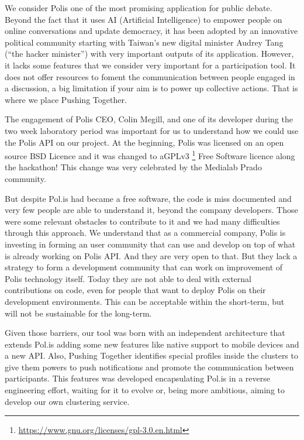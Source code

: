 \documentclass{llncs}
\begin{document}
  We consider Polis one of the most promising application for public debate.
Beyond the fact that it uses AI (Artificial Intelligence) to empower people
on online conversations and update democracy, it has been adopted by an
innovative political community starting with Taiwan's new digital minister
Audrey Tang (“the hacker minister”) with very important outputs of its
application. However, it lacks some features that we consider very important
for a participation tool. It does not offer resources to foment the
communication between people engaged in a discussion, a big limitation if your
aim is to power up collective actions. That is where we place Pushing
Together.

  The engagement of Polis CEO, Colin Megill, and one of its developer during the
two week laboratory period was important for us to understand how we could use
the Polis API on our project. At the beginning, Polis was licensed on an open
source BSD Licence and it was changed to
aGPLv3 \footnote{\url{https://www.gnu.org/licenses/gpl-3.0.en.html}}
Free Software licence along the hackathon! This change was very celebrated by
the Medialab Prado community.

  But despite Pol.is had became a free software, the code is miss documented and
very few people are able to understand it, beyond the company developers. Those
were some relevant obstacles to contribute to it and we had many  difficulties
through this approach. We understand that as a commercial company, Polis is
investing in forming an user community that can use and develop on top of what
is already working on Polis API. And they are very open to that. But they lack
a strategy to form a development community that can work on improvement of
Polis technology itself. Today they are not able to deal with external
contributions on code, even for people that want to deploy Polis on their
development environments. This can be acceptable within the short-term, but
will not be sustainable for the long-term.

  Given those barriers, our tool was born with an independent architecture
that extends Pol.is adding some new features like native support to mobile
devices and a new API. Also, Pushing Together identifies special profiles
inside the clusters to give them powers to push notifications and promote the
communication between participants. This features was developed encapsulating
Pol.is in a reverse engineering effort, waiting for it to evolve or, being more
ambitious, aiming to develop our own clustering service.
\end{document}

